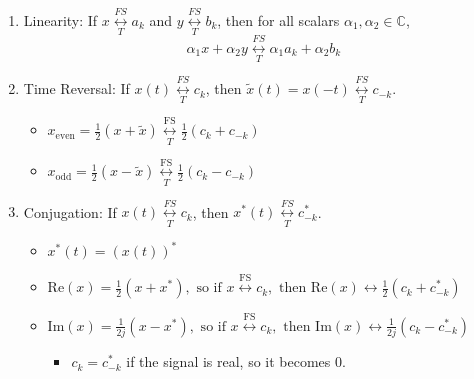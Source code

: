 \begin{definition}
    \begin{enumerate}
        \item Linearity: If \( x \underset{T}{\overset{FS}{\longleftrightarrow}} a_k \) and \( y \underset{T}{\overset{FS}{\longleftrightarrow}} b_k \), then for all scalars \(\alpha_1, \alpha_2 \in \mathbb{C} \),
        \[
        \alpha_1 x + \alpha_2 y \underset{T}{\overset{FS}{\longleftrightarrow}} \alpha_1 a_k + \alpha_2 b_k
        \]
    
        \item Time Reversal: If \( x(t) \underset{T}{\overset{FS}{\longleftrightarrow}} c_k \), then \( \tilde{x}(t) = x(-t) \underset{T}{\overset{FS}{\longleftrightarrow}} c_{-k} \).
        \begin{itemize}
            \item $x_{\text{even}} = \frac{1}{2} \left( x + \tilde{x} \right) \underset{T}{\overset{\text{FS}}{\longleftrightarrow}} \frac{1}{2} \left( c_k + c_{-k} \right)$
            \item $x_{\text{odd}} = \frac{1}{2} \left( x - \tilde{x} \right) \underset{T}{\overset{\text{FS}}{\longleftrightarrow}} \frac{1}{2} \left( c_k - c_{-k} \right)$    
        \end{itemize}
    
        \item Conjugation: If \( x(t) \underset{T}{\overset{FS}{\longleftrightarrow}} c_k \), then \( x^*(t) \underset{T}{\overset{FS}{\longleftrightarrow}} c_{-k}^* \).
        \begin{itemize}
            \item $x^*(t) = (x(t))^*$
        \end{itemize}
        \begin{itemize}
            \item $\text{Re}(x) = \frac{1}{2} (x + x^*), \text{ so if } x \overset{\text{FS}}{\longleftrightarrow} c_k, \text{ then } \text{Re}(x) \longleftrightarrow \frac{1}{2} (c_k + c_{-k}^*)$
            \item $\text{Im}(x) = \frac{1}{2j} (x - x^*), \text{ so if } x \overset{\text{FS}}{\longleftrightarrow} c_k, \text{ then } \text{Im}(x) \longleftrightarrow \frac{1}{2j} (c_k - c_{-k}^*)$
            \begin{itemize}
                \item $c_k = c_{-k}^*$ if the signal is real, so it becomes $0$.
            \end{itemize}
        \end{itemize}
    

\end{enumerate}
\end{definition}
